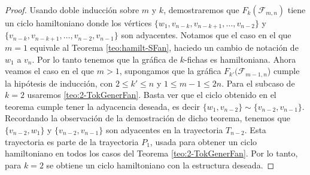     \begin{proof}
        Usando doble inducci\'on sobre $m$ y $k$, demostraremos que
        $F_k(\mathcal{F}_{m,n})$ tiene un ciclo hamiltoniano donde los v\'ertices $\{w_1,
        v_{n-k}, v_{n-k+1}, \dots, v_{n-2}\}$ y $\{v_{n-k}, v_{n-k+1}, \dots,
        v_{n-2}, v_{n-1}\}$ son adyacentes. Notamos que el caso en el que $m =1$
        equivale al Teorema \ref{teo:hamilt-SFan}, haciedo un cambio de
        notaci\'on de $w_1$ a $v_n$. Por lo tanto tenemos que la gr\'afica de
        $k$-fichas es hamiltoniana. Ahora veamos el caso en el que $m>1$,
        supongamos que la gr\'afica $F_{k'}(\mathcal{F}_{m-1,n}$) cumple la hip\'otesis de
        inducci\'on, con $2\leq k'\leq n$ y $1 \leq m-1 \leq 2n$. Para el subcaso de
        $k=2$ usaremos \cref{teo:2-TokGenerFan}. Basta ver que el ciclo
        obtenido en el teorema cumple tener la adyacencia deseada, es decir
        $\{w_1, v_{n-2}\}\sim\{v_{n-2}, v_{n-1}\}$. Recordando la observaci\'on
        de la demostraci\'on de dicho teorema, tenemos que $\{v_{n-2},w_1\}$ y
        $\{v_{n-2},v_{n-1}\}$ son adyacentes en la trayectoria $T_{n-2}$. Esta
        trayectoria es parte de la trayectoria $P_1$, usada para obtener un
        ciclo hamiltoniano en todos los casos del Teorema
        \ref{teo:2-TokGenerFan}. Por lo tanto, para $k=2$ se obtiene un ciclo
        hamiltoniano con la estructura deseada.


\end{proof}
